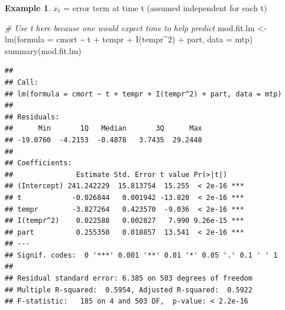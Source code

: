\documentclass[
]{book}
\newenvironment{Shaded}{\begin{snugshade}}{\end{snugshade}}
\newcommand{\AttributeTok}[1]{\textcolor[rgb]{0.77,0.63,0.00}{#1}}
\newcommand{\CommentTok}[1]{\textcolor[rgb]{0.56,0.35,0.01}{\textit{#1}}}
\newcommand{\DecValTok}[1]{\textcolor[rgb]{0.00,0.00,0.81}{#1}}
\newcommand{\FunctionTok}[1]{\textcolor[rgb]{0.00,0.00,0.00}{#1}}
\newcommand{\NormalTok}[1]{#1}
\newcommand{\OtherTok}[1]{\textcolor[rgb]{0.56,0.35,0.01}{#1}}
\newcommand{\SpecialCharTok}[1]{\textcolor[rgb]{0.00,0.00,0.00}{#1}}
\newcommand{\StringTok}[1]{\textcolor[rgb]{0.31,0.60,0.02}{#1}}
\theoremstyle{definition}
\theoremstyle{definition}
\newtheorem{example}{Example}[chapter]
\theoremstyle{definition}
\theoremstyle{definition}
\theoremstyle{remark}
\begin{document}
\begin{example}
\(x_t\) = error term at time t (assumed independent for each t)

\begin{Shaded}
\begin{Highlighting}[]
\CommentTok{\# Use t here because one would expect time to help predict}
\NormalTok{mod.fit.lm }\OtherTok{\textless{}{-}} \FunctionTok{lm}\NormalTok{(}\AttributeTok{formula =}\NormalTok{ cmort }\SpecialCharTok{\textasciitilde{}}\NormalTok{ t }\SpecialCharTok{+}\NormalTok{ tempr }\SpecialCharTok{+} \FunctionTok{I}\NormalTok{(tempr}\SpecialCharTok{\^{}}\DecValTok{2}\NormalTok{) }
    \SpecialCharTok{+}\NormalTok{ part, }\AttributeTok{data =}\NormalTok{ mtp)}
\FunctionTok{summary}\NormalTok{(mod.fit.lm)}
\end{Highlighting}
\end{Shaded}

\begin{verbatim}
## 
## Call:
## lm(formula = cmort ~ t + tempr + I(tempr^2) + part, data = mtp)
## 
## Residuals:
##      Min       1Q   Median       3Q      Max 
## -19.0760  -4.2153  -0.4878   3.7435  29.2448 
## 
## Coefficients:
##               Estimate Std. Error t value Pr(>|t|)    
## (Intercept) 241.242229  15.813754  15.255  < 2e-16 ***
## t            -0.026844   0.001942 -13.820  < 2e-16 ***
## tempr        -3.827264   0.423570  -9.036  < 2e-16 ***
## I(tempr^2)    0.022588   0.002827   7.990 9.26e-15 ***
## part          0.255350   0.018857  13.541  < 2e-16 ***
## ---
## Signif. codes:  0 '***' 0.001 '**' 0.01 '*' 0.05 '.' 0.1 ' ' 1
## 
## Residual standard error: 6.385 on 503 degrees of freedom
## Multiple R-squared:  0.5954, Adjusted R-squared:  0.5922 
## F-statistic:   185 on 4 and 503 DF,  p-value: < 2.2e-16
\end{verbatim}

\begin{Shaded}
\end{Shaded}


\end{example}
\end{document}
